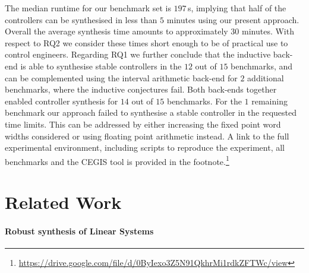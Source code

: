 \documentclass{sig-alternate-05-2015}
\begin{document}
The median runtime for our benchmark set is $197$\,s, implying that half of
the controllers can be synthesised in less than $5$ minutes using our
present approach.  Overall the average synthesis time amounts to
approximately $30$ minutes.  With respect to RQ2 we consider these times
short enough to be of practical use to control engineers.  Regarding RQ1 we
further conclude that the inductive back-end is able to synthesise stable
controllers in the $12$ out of $15$ benchmarks, and can be complemented
using the interval arithmetic back-end for $2$ additional benchmarks, where
the inductive conjectures fail.  Both back-ends together enabled controller
synthesis for $14$ out of $15$ benchmarks.  For the $1$ remaining benchmark
our approach failed to synthesise a stable controller in the requested time
limits.  This can be addressed by either increasing the fixed point word
widths considered or using floating point arithmetic instead.  A link to the
full experimental environment, including scripts to reproduce the
experiment, all benchmarks and the CEGIS tool is provided in the
footnote.\footnote{\url{https://drive.google.com/file/d/0ByIexo3Z5N91QkhrMi1rdkZFTWc/view}}

\section{Related Work}

\paragraph{Robust synthesis of Linear Systems} 
\end{document}
